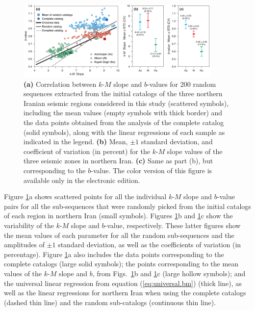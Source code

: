 \begin{figure}%
	\centering
	\includegraphics[width=0.9\textwidth]{figures/pdf/figure-08} 
	\caption{\textbf{(a)} Correlation between $k$-$M$ slope and $b$-values for 200 random sequences extracted from the initial catalogs of the three northern Iranian seismic regions considered in this study (scattered symbols), including the mean values (empty symbols with thick border) and the data points obtained from the analysis of the complete catalog (solid symbols), along with the linear regressions of each sample as indicated in the legend. \textbf{(b)} Mean, $\pm1$ standard deviation, and coefficient of variation (in percent) for the $k$-$M$ slope values of the three seismic zones in northern Iran. \textbf{(c)} Same as part (b), but corresponding to the $b$-value. The color version of this figure is available only in the electronic edition.}
	\label{fig:random}
\end{figure}

Figure \ref{fig:random}a shows scattered points for all the individual $k$-$M$ slope and $b$-value pairs for all the sub-sequences that were randomly picked from the initial catalogs of each region in northern Iran (small symbols). Figures \ref{fig:random}b and \ref{fig:random}c show the variability of the $k$-$M$ slope and $b$-value, respectively. These latter figures show the mean values of each parameter for all the random sub-sequences and the amplitudes of $\pm 1$ standard deviation, as well as the coefficients of variation (in percentage). Figure \ref{fig:random}a also includes the data points corresponding to the complete catalogs (large solid symbols); the points corresponding to the mean values of the $k$-$M$ slope and $b$, from Figs.~\ref{fig:random}b and \ref{fig:random}c (large hollow symbols); and the universal linear regression from equation (\ref{eq:universal.bm}) (thick line), as well as the linear regressions for northern Iran when using the complete catalogs (dashed thin line) and the random sub-catalogs (continuous thin line). 


